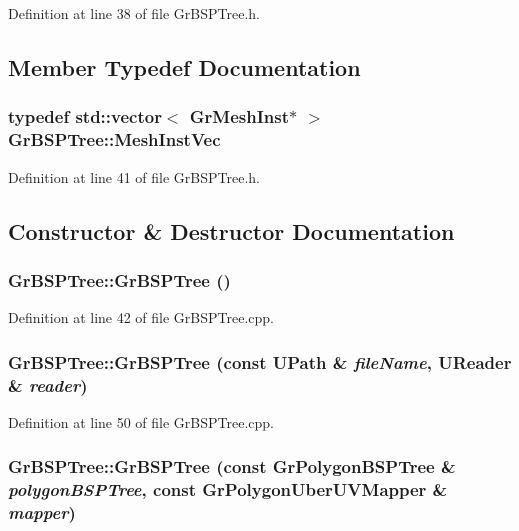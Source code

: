 Definition at line 38 of file GrBSPTree.h.

\subsection{Member Typedef Documentation}
\hypertarget{class_gr_b_s_p_tree_17eda1992ed024630ab8ae114f7c78a3}{
\subsubsection[{MeshInstVec}]{\setlength{\rightskip}{0pt plus 5cm}typedef std::vector$<$ {\bf GrMeshInst}$\ast$ $>$ {\bf GrBSPTree::MeshInstVec}}}
\label{class_gr_b_s_p_tree_17eda1992ed024630ab8ae114f7c78a3}




Definition at line 41 of file GrBSPTree.h.

\subsection{Constructor \& Destructor Documentation}
\hypertarget{class_gr_b_s_p_tree_74ddd5b1e416fcf6afe52d705c19af77}{
\subsubsection[{GrBSPTree}]{\setlength{\rightskip}{0pt plus 5cm}GrBSPTree::GrBSPTree ()}}
\label{class_gr_b_s_p_tree_74ddd5b1e416fcf6afe52d705c19af77}




Definition at line 42 of file GrBSPTree.cpp.\hypertarget{class_gr_b_s_p_tree_457ee72d9c2b4d6ea5db3008bd06b5c6}{
\subsubsection[{GrBSPTree}]{\setlength{\rightskip}{0pt plus 5cm}GrBSPTree::GrBSPTree (const {\bf UPath} \& {\em fileName}, \/  {\bf UReader} \& {\em reader})}}
\label{class_gr_b_s_p_tree_457ee72d9c2b4d6ea5db3008bd06b5c6}




Definition at line 50 of file GrBSPTree.cpp.\hypertarget{class_gr_b_s_p_tree_ec54138b350c38053b2e1020afa25731}{
\subsubsection[{GrBSPTree}]{\setlength{\rightskip}{0pt plus 5cm}GrBSPTree::GrBSPTree (const {\bf GrPolygonBSPTree} \& {\em polygonBSPTree}, \/  const {\bf GrPolygonUberUVMapper} \& {\em mapper})}}
\label{class_gr_b_s_p_tree_ec54138b350c38053b2e1020afa25731}




